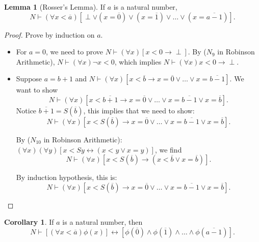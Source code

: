 \documentclass[11pt,letterpaper]{book}
\theoremstyle{definition}
\newtheorem{lemma}{Lemma}[section]
\newtheorem{corollary}{Corollary}[section]
\begin{document}
\begin{lemma}[Rosser's Lemma]
\label{lemma:Rosser}
If $a$ is a natural number, $$ N \vdash (\forall x < \overline{a}) [
\perp \lor ( x = \overline{0} ) \lor (x = \overline{1}) \lor \ldots \lor
(x = \overline{a-1}) ]  . $$
\end{lemma}

\begin{proof}
Prove by induction on $a$.

\begin{itemize}
\item{For $a=0$, we need to prove $N \vdash (\forall x) [ x <0 \rightarrow \perp ]$. By ($N_9$ in Robinson Arithmetic), $N \vdash (\forall x ) \lnot x < 0$, which implies $N \vdash (\forall x ) x < 0 \rightarrow \perp$.}
\item{Suppose $a=b+1$ and $N \vdash (\forall x) [ x < \overline{b} \rightarrow x = \overline{0} \lor \ldots \lor x = \overline{b-1} ]$. We want to show 
$$ N \vdash (\forall x) [ x < \overline{b+1} \rightarrow x = \overline{0} \lor \ldots \lor x = \overline{b-1} \lor x = \overline{b} ]. $$
Notice $\overline{b+1} = S (\overline{b})$, this implies that we need to show:
$$ N \vdash (\forall x) [ x < S(\overline{b}) \rightarrow x = \overline{0} \lor \ldots \lor x =  \overline{b-1} \lor x = \overline{b} ]. $$

By ($N_{10}$ in Robinson Arithmetic): $ (\forall x)(\forall y) [x < Sy \leftrightarrow (x < y \lor x = y )] $, we find 
$$ N \vdash (\forall x) [ x < S(\overline{b}) \rightarrow ( x < \overline{b} \lor x = \overline{b} ) ].$$

By induction hypothesis, this is:
 $$ N \vdash (\forall x) [ x < S(\overline{b}) \rightarrow x = \overline{0} \lor \ldots \lor x = \overline{b-1} \lor x = \overline{b} ]. $$

}
\end{itemize}
\end{proof}

\begin{corollary}
\label{corollary:rosser}
If $a$ is a natural number, then $$ N \vdash [(\forall x < \overline{a})
\phi(x)] \leftrightarrow [ \phi(\overline{0}) \land \phi( \overline{1} )
\land \ldots \land \phi( \overline{a-1} ) ] .$$
\end{corollary}
\end{document}
